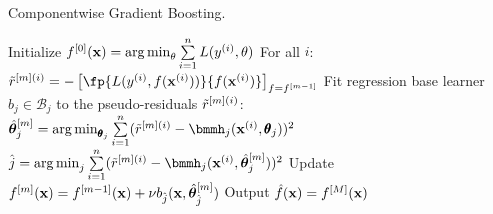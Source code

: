 
\begin{algorithm}[H]
  \begin{footnotesize}
  \begin{center}
  \caption{Componentwise Gradient Boosting.}
    \begin{algorithmic}[1]
      \State Initialize $f^{[0]}(\mathbf{x}) = \operatorname{arg\,min}_{\theta} \sum  \limits_{i=1}^n L(y^{(i)}, \theta)$
        \State For all $i$: $\rmi = -\left[\fp{L(\yi, f(\xi))}{f(\xi)}\right]_{f=\fmd}$
          \State Fit regression base learner $\hat{b}_j \in \mathcal{B}_j$ to the pseudo-residuals $\tilde{r}^{[m](i)}$:
          \State $\thetamh_j = \argmin_{\pmb\theta_j} \sum  \limits_{i=1}^n 
          (\rmi - \bmmh_j(\xi, \pmb\theta_j))^2$
        \EndFor
        \State $\hat{j} = \argmin_{j} \sum  \limits_{i=1}^n (\rmi - \bmmh_j(\xi, \thetamh_j))^2$
        \State Update $f^{[m]}(\mathbf{x}) = f^{[m-1]}(\mathbf{x}) + \nu b_{\hat{j}}(\mathbf{x}, \hat{\bm{\theta}}^{[m]}_{\hat{j}})$
      \EndFor
      \State Output $\hat{f}(\mathbf{x}) = f^{[M]}(\mathbf{x})$
    \end{algorithmic}
    \end{center}
    \end{footnotesize}
\end{algorithm}
